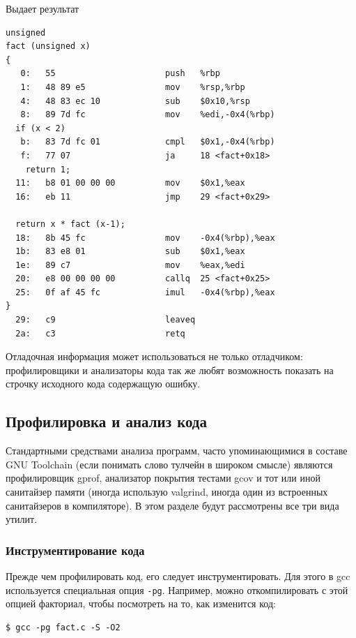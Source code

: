 \documentclass[a4paper,12pt,oneside]{article}
\begin{document}
Выдает результат

\begin{verbatim}
unsigned
fact (unsigned x)
{
   0:	55                   	push   %rbp
   1:	48 89 e5             	mov    %rsp,%rbp
   4:	48 83 ec 10          	sub    $0x10,%rsp
   8:	89 7d fc             	mov    %edi,-0x4(%rbp)
  if (x < 2)
   b:	83 7d fc 01          	cmpl   $0x1,-0x4(%rbp)
   f:	77 07                	ja     18 <fact+0x18>
    return 1;
  11:	b8 01 00 00 00       	mov    $0x1,%eax
  16:	eb 11                	jmp    29 <fact+0x29>

  return x * fact (x-1);
  18:	8b 45 fc             	mov    -0x4(%rbp),%eax
  1b:	83 e8 01             	sub    $0x1,%eax
  1e:	89 c7                	mov    %eax,%edi
  20:	e8 00 00 00 00       	callq  25 <fact+0x25>
  25:	0f af 45 fc          	imul   -0x4(%rbp),%eax
}
  29:	c9                   	leaveq 
  2a:	c3                   	retq   
\end{verbatim}

Отладочная информация может использоваться не только отладчиком: профилировщики и анализаторы кода так же любят возможность показать на строчку исходного кода содержащую ошибку.

\pagebreak
\subsection{Профилировка и анализ кода}\label{subsec:CodeAnalysis}

Стандартными средствами анализа программ, часто упоминающимися в составе GNU Toolchain (если понимать слово тулчейн в широком смысле) являются профилировщик gprof, анализатор покрытия тестами gcov и тот или иной санитайзер памяти (иногда использую valgrind, иногда один из встроенных санитайзеров в компиляторе). В этом разделе будут рассмотрены все три вида утилит.

\subsubsection{Инструментирование кода}\label{subsubsec:Instrum}

Прежде чем профилировать код, его следует инструментировать. Для этого в gcc используется специальная опция \lstinline!-pg!. Например, можно откомпилировать с этой опцией факториал, чтобы посмотреть на то, как изменится код:

\begin{verbatim}
$ gcc -pg fact.c -S -O2
\end{verbatim}
\end{document}
